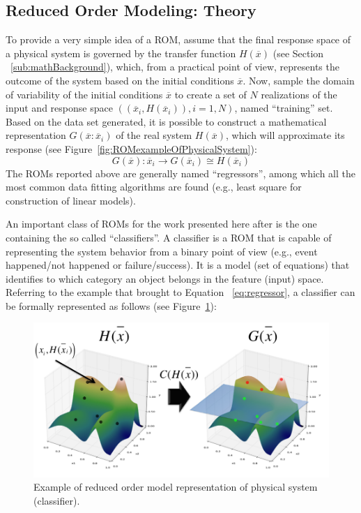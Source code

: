 \subsection{Reduced Order Modeling: Theory}
\label{sec:ROMsTheory}
To provide a very simple idea of a ROM, assume that the final
response space of a physical system is governed by the transfer
function $H \left (  \overline{x}\right)$ (see Section
~\ref{sub:mathBackground}), which, from a practical point of
view, represents the outcome of the system based on the initial
conditions  $\overline{x}$. Now, sample the domain of variability of the
initial conditions $\overline{x}$ to create a
set of $N$ realizations of the input and response space $ \left ( \left (
\overline{x}_{i}, H \left (  \overline{x}_{i}\right) \right), i=1,N \right)$,
named ``training'' set. Based on the data set generated, it is possible
to construct a mathematical representation $G\left ( \overline{x}:
\overline{x}_{i}\right)$ of the
real system $H \left (  \overline{x}\right)$, which will approximate its
response (see Figure~\ref{fig:ROMexampleOfPhysicalSystem}):
\begin{equation}
\label{eq:regressor}
G\left ( \overline{x} \right ):\overline{x}_{i} \rightarrow G\left ( \overline{x}_{i} \right ) \cong H\left ( \overline{x}_{i} \right )
\end{equation}
The ROMs reported above are generally named ``regressors'', among
which all the most common data fitting algorithms are found (e.g.,
least square for construction of linear models).

An important class of ROMs for the work presented here after is the
one containing the so called ``classifiers''. A classifier is a ROM that is
capable of representing the system behavior from a binary point of
view (e.g., event happened/not happened or failure/success). It is a
model (set of equations) that identifies to which category an object
belongs in the feature (input) space. Referring to the example that
brought to Equation ~\ref{eq:regressor}, a classifier can be formally represented as follows (see
Figure~\ref{fig:ROMClassifierExampleOfPhysicalSystem}):
\begin{figure}[h!]
  \centering
  \includegraphics[width=1.0\textwidth]  {pics/ROMClassifierExampleOfPhysicalSystem.png}
  \caption{Example of reduced order model representation of physical system (classifier).}
  \label{fig:ROMClassifierExampleOfPhysicalSystem}
\end{figure}

